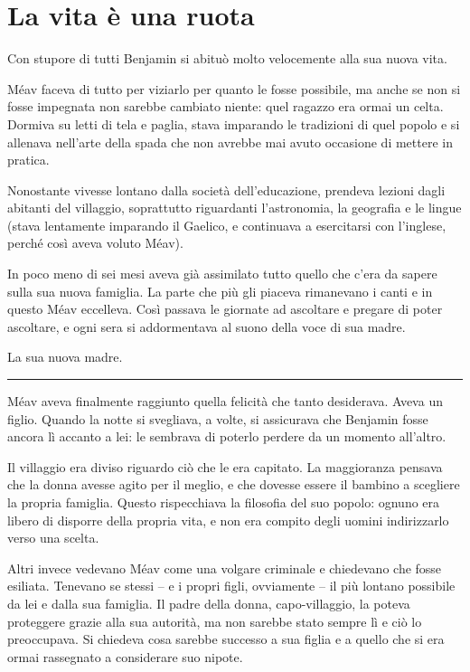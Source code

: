 \chapter{La vita è una ruota}
\label{ch:la-vita-e-una-ruota}

Con stupore di tutti Benjamin si abituò molto velocemente alla sua nuova vita.

Méav faceva di tutto per viziarlo per quanto le fosse possibile, ma anche se non si fosse impegnata
non sarebbe cambiato niente: quel ragazzo era ormai un celta. Dormiva su letti di tela e paglia,
stava imparando le tradizioni di quel popolo e si allenava nell'arte della spada che non avrebbe mai
avuto occasione di mettere in pratica.

Nonostante vivesse lontano dalla società dell'educazione, prendeva lezioni dagli abitanti del
villaggio, soprattutto riguardanti l'astronomia, la geografia e le lingue (stava lentamente
imparando il Gaelico, e continuava a esercitarsi con l'inglese, perché così aveva voluto Méav).

In poco meno di sei mesi aveva già assimilato tutto quello che c'era da sapere sulla sua nuova
famiglia. La parte che più gli piaceva rimanevano i canti e in questo Méav eccelleva. Così passava
le giornate ad ascoltare e pregare di poter ascoltare, e ogni sera si addormentava al suono della
voce di sua madre.

La sua nuova madre.

\plainbreak{1}

Méav aveva finalmente raggiunto quella felicità che tanto desiderava. Aveva un figlio. Quando la
notte si svegliava, a volte, si assicurava che Benjamin fosse ancora lì accanto a lei: le sembrava
di poterlo perdere da un momento all'altro.

Il villaggio era diviso riguardo ciò che le era capitato. La maggioranza pensava che la donna avesse
agito per il meglio, e che dovesse essere il bambino a scegliere la propria famiglia. Questo
rispecchiava la filosofia del suo popolo: ognuno era libero di disporre della propria vita, e non
era compito degli uomini indirizzarlo verso una scelta.

Altri invece vedevano Méav come una volgare criminale e chiedevano che fosse esiliata. Tenevano se
stessi -- e i propri figli, ovviamente -- il più lontano possibile da lei e dalla sua famiglia. Il
padre della donna, capo-villaggio, la poteva proteggere grazie alla sua autorità, ma non sarebbe
stato sempre lì e ciò lo preoccupava. Si chiedeva cosa sarebbe successo a sua figlia e a quello che
si era ormai rassegnato a considerare suo nipote.

